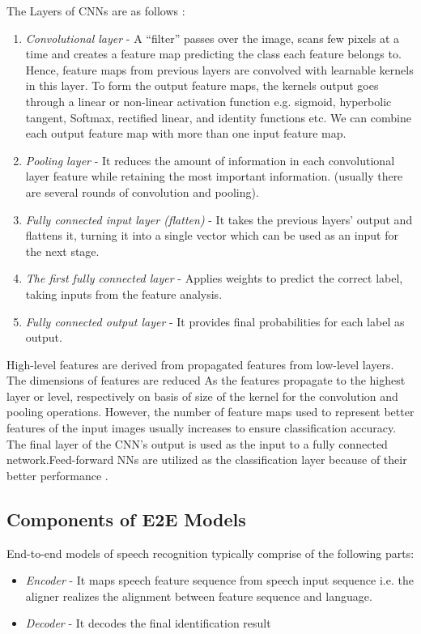 The Layers of CNNs are as follows \cite{abdel-hamid_convolutional_2014}: 
\begin{enumerate}
    \item \textit{Convolutional layer} - A “filter” passes over the image, scans few pixels at a time and creates a feature map predicting the class each feature belongs to. Hence, feature maps from previous layers are convolved with learnable kernels in this layer. To form the output feature maps, the kernels output goes through a linear or non-linear activation function e.g. sigmoid, hyperbolic tangent, Softmax, rectified linear, and identity functions etc. We can combine each output feature map with more than one input feature map.
    \item \textit{Pooling layer} - It reduces the amount of information in each convolutional layer feature while retaining the most important information. (usually there are several rounds of convolution and pooling).
    \item \textit{Fully connected input layer (flatten)} - It takes the previous layers' output and flattens it, turning it into a single vector which can be used as an input for the next stage.
    \item \textit{The first fully connected layer} - Applies weights to predict the correct label, taking inputs from the feature analysis. 
    \item \textit{Fully connected output layer} - It provides final probabilities for each label as output.
\end{enumerate}

High-level features are derived from propagated features from low-level layers. The dimensions of features are reduced As the features propagate to the highest layer or level, respectively on basis of size of the kernel for the convolution and pooling operations. However, the number of feature maps used to represent better features of the input images usually increases to ensure classification accuracy. The final layer of the CNN's output is used as the input to a fully connected network.Feed-forward NNs are utilized as the classification layer because of their better performance \cite{backstrom_introduction_2022}.

\subsection{Components of E2E Models}
End-to-end models of speech recognition typically comprise of the following parts: 
\begin{itemize}
    \item \textit{Encoder} - It maps speech feature sequence from speech input sequence i.e. the aligner realizes the alignment between feature sequence and language.
    \item  \textit{Decoder} - It decodes the final identification result
\end{itemize}

